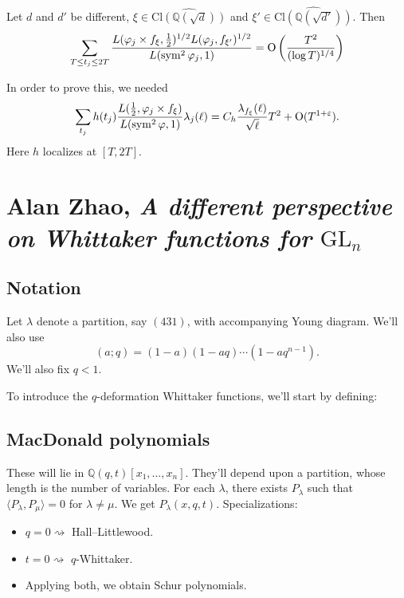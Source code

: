 \documentclass[reqno]{amsart} 
\begin{document}
\begin{theorem}
  Let $d$ and $d'$ be different, $\xi \in \widehat{\mathrm{Cl}(\mathbb{Q}(\sqrt{d}))}$ and $\xi' \in \widehat{\mathrm{Cl}(\mathbb{Q}(\sqrt{d'}))}$.  Then
  \begin{equation*}
    \sum_{T \leq t_j \leq 2 T}
    \frac{L(\varphi_j \times f_\xi, \frac{1}{2})^{1/2} L(\varphi_j, f_{\xi '})^{1/2}}{L(\operatorname{sym}^2 \varphi_j, 1)}
    = \operatorname{O}\left( \frac{T^2}{(\log T)^{1/4}}\right)
  \end{equation*}
\end{theorem}
In order to prove this, we needed
\begin{equation*}
  \sum_{t_j} h(t_j) \frac{L(\tfrac{1}{2}, \varphi_j \times f_{\xi})}{L(\operatorname{sym}^2 \varphi, 1)}
  \lambda_j(\ell) = C_h
  \frac{\lambda_{f_{\xi}}(\ell)}{\sqrt{\ell}} T^2 + \operatorname{O}(T^{1 + \varepsilon}).
\end{equation*}
Here $h$ localizes at $[T, 2 T]$.

\section{Alan Zhao, \emph{A different perspective on Whittaker functions for} $\mathrm{GL}_n$}

\subsection{Notation}

Let $\lambda$ denote a partition, say $(4 3 1)$, with accompanying Young diagram.  We'll also use
\begin{equation*}
  (a;q) =(1 - a)(1 - a q) \dotsb(1 - a q^{n - 1}).
\end{equation*}
We'll also fix $q < 1$.

To introduce the $q$-deformation Whittaker functions, we'll start by defining:
\subsection{MacDonald polynomials}
These will lie in $\mathbb{Q}(q, t)[x_1, \dotsc, x_n]$.  They'll depend upon a partition, whose length is the number of variables.  For each $\lambda$, there exists $P_\lambda$ such that $\langle P_\lambda, P_\mu \rangle = 0$ for $\lambda \neq \mu$.  We get $P_\lambda(x, q, t)$.  Specializations:
\begin{itemize}
\item $q = 0 \rightsquigarrow$ Hall--Littlewood.
\item $t = 0 \rightsquigarrow$ $q$-Whittaker.
\item Applying both, we obtain Schur polynomials.
\end{itemize}
\end{document}
